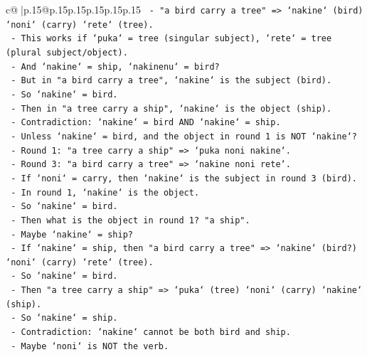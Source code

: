 \documentclass{article}
\begin{document}
{\begin{supertabular}{c@{$\;$}|p{.15\linewidth}@{}p{.15\linewidth}p{.15\linewidth}p{.15\linewidth}p{.15\linewidth}p{.15\linewidth}}
{{{\texttt{                    {-} "a bird carry a tree" => `nakine` (bird) `noni` (carry) `rete` (tree).} \\
\texttt{                    {-} This works if `puka` = tree (singular subject), `rete` = tree (plural subject/object).} \\
\texttt{                    {-} And `nakine` = ship, `nakinenu` = bird?} \\
\texttt{                    {-} But in "a bird carry a tree", `nakine` is the subject (bird).} \\
\texttt{                    {-} So `nakine` = bird.} \\
\texttt{                    {-} Then in "a tree carry a ship", `nakine` is the object (ship).} \\
\texttt{                    {-} Contradiction: `nakine` = bird AND `nakine` = ship.} \\
\texttt{                    {-} Unless `nakine` = bird, and the object in round 1 is NOT `nakine`?} \\
\texttt{                    {-} Round 1: "a tree carry a ship" => `puka noni nakine`.} \\
\texttt{                    {-} Round 3: "a bird carry a tree" => `nakine noni rete`.} \\
\texttt{                    {-} If `noni` = carry, then `nakine` is the subject in round 3 (bird).} \\
\texttt{                    {-} In round 1, `nakine` is the object.} \\
\texttt{                    {-} So `nakine` = bird.} \\
\texttt{                    {-} Then what is the object in round 1? "a ship".} \\
\texttt{                    {-} Maybe `nakine` = ship?} \\
\texttt{                    {-} If `nakine` = ship, then "a bird carry a tree" => `nakine` (bird?) `noni` (carry) `rete` (tree).} \\
\texttt{                    {-} So `nakine` = bird.} \\
\texttt{                    {-} Then "a tree carry a ship" => `puka` (tree) `noni` (carry) `nakine` (ship).} \\
\texttt{                    {-} So `nakine` = ship.} \\
\texttt{                    {-} Contradiction: `nakine` cannot be both bird and ship.} \\
\texttt{                    {-} Maybe `noni` is NOT the verb.} \\
}}}
\end{supertabular}}
\end{document}
